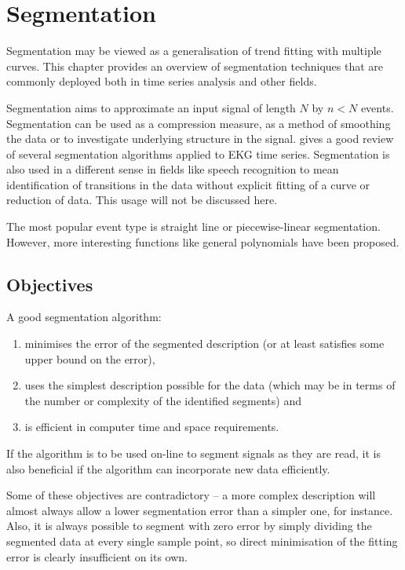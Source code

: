 \chapter{Segmentation}\label{chap:lit:segmentation}
\begin{overview}
  Segmentation may be viewed as a generalisation of trend fitting with multiple curves.
  This chapter provides an overview of segmentation techniques that are commonly deployed both in time series analysis and other fields.
\end{overview}

Segmentation aims to approximate an input signal of length $N$ by $n<N$ events.
Segmentation can be used as a compression measure, as a method of smoothing the data or to investigate underlying structure in the signal.
\citet{keogh.chu.ea1993segmenting} gives a good review of several segmentation algorithms applied to EKG time series.
Segmentation is also used in a different sense in fields like speech recognition to mean identification of transitions in the data without explicit fitting of a curve or reduction of data.
This usage will not be discussed here.

The most popular event type is straight line or piecewise-linear segmentation.
However, more interesting functions like general polynomials \citep{arora.khot2003fitting} have been proposed.

\section{Objectives}
\label{sec:objectives}

A good segmentation algorithm:
\begin{enumerate}
\item minimises the error of the segmented description (or at least satisfies some upper bound on the error),
\item uses the simplest description possible for the data (which may be in terms of the number or complexity of the identified segments) and
\item is efficient in computer time and space requirements.
\end{enumerate}
If the algorithm is to be used on-line to segment signals as they are read, it is also beneficial if the algorithm can incorporate new
data efficiently.

Some of these objectives are contradictory -- a more complex description will almost always allow a lower segmentation error than a simpler one, for instance.
Also, it is always possible to segment with zero error by simply dividing the segmented data at every single sample point, so direct minimisation of the fitting error is clearly insufficient on its own.

